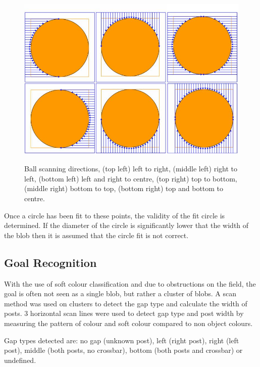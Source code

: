 \begin{figure}[!ht]
\begin{center}
    \scalebox{0.3} {\includegraphics{stevenfigs/objectBall3.png} }
    \caption{Ball scanning directions,  (top left) left to right, (middle left) right to left, (bottom left) left and right to centre, (top right)  top to bottom, (middle right) bottom to top, (bottom right) top and bottom to centre.}
    \label{fig:objectBall3}
\end{center}
\end{figure}

Once a circle has been fit to these points, the validity of the fit circle is determined. If the diameter of the circle is significantly lower that the width of the blob then it is assumed that the circle fit is not correct.


\subsection{Goal Recognition}

With the use of soft colour classification and due to obstructions on the field, the goal is often not seen as a single blob, but rather a cluster of blobs. A scan method was used on clusters to detect the gap type and calculate the width of posts. 3 horizontal scan lines were used to detect gap type and post width by measuring the pattern of colour and soft colour compared to non object colours.

Gap types detected are: no gap (unknown post), left (right post), right (left post), middle (both posts, no crossbar), bottom (both posts and crossbar) or undefined. 

